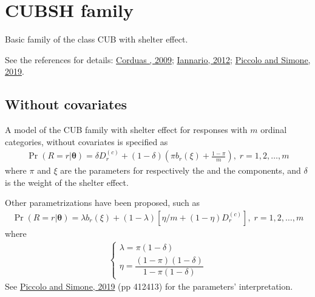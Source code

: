 \documentclass[letterpaper,10pt,english]{sphinxmanual}
\begin{document}
\noindent{}


\section{CUBSH family}
\label{\detokenize{manual:cubsh-family}}
\sphinxAtStartPar
Basic family of the class CUB with shelter effect.

\sphinxAtStartPar
See the references for details: \hyperlink{cite.references:id10}{Corduas , 2009};
\hyperlink{cite.references:id9}{Iannario, 2012};
\hyperlink{cite.references:id3}{Piccolo and Simone, 2019}.


\subsection{Without covariates}
\label{\detokenize{manual:cubsh-without-covariates}}\label{\detokenize{manual:id16}}
\sphinxAtStartPar
{}

\sphinxAtStartPar
A model of the CUB family with shelter effect
for responses with \(m\) ordinal categories, without covariates is specified as
\begin{equation*}
\begin{split}\Pr(R=r|\boldsymbol{\theta}) = \delta D_r^{(c)} + (1-\delta)\left(\pi b_r(\xi) + \frac{1-\pi}{m} \right)
,\; r=1,2,\ldots,m\end{split}
\end{equation*}
\sphinxAtStartPar
where \(\pi\) and \(\xi\) are the parameters for respectively the  and the
 components, and \(\delta\) is the weight of the shelter effect.

\sphinxAtStartPar
Other parametrizations have been proposed, such as
\begin{equation*}
\begin{split}\Pr(R=r|\boldsymbol{\theta}) = \lambda b_r(\xi) + (1-\lambda) \left[ \eta/m + (1-\eta) D_r^{(c)} \right]
,\; r=1,2,\ldots,m\end{split}
\end{equation*}
\sphinxAtStartPar
where
\begin{equation*}
\begin{split}\left\{
\begin{array}{l}
    \lambda = \pi(1-\delta)
    \\
    \eta = \dfrac{(1-\pi)(1-\delta)}{1 - \pi(1-\delta)}
\end{array}
\right.\end{split}
\end{equation*}
\sphinxAtStartPar
See \hyperlink{cite.references:id3}{Piccolo and Simone, 2019} (pp 412\sphinxhyphen{}413) for the parameters’ interpretation.
\end{document}
